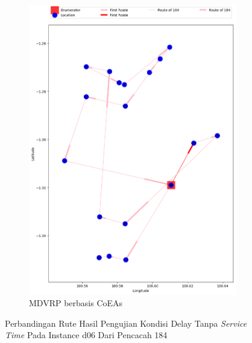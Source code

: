 \begin{figure}[H]
	\centering
	\begin{subfigure}[t]{\textwidth}
		\centering
		\includegraphics[width=\textwidth]{Resources/Images/delayed_6/real_m15_n100_delayed_6_184_coes}
		\caption{MDVRP berbasis CoEAs}
		\label{fig:real_m15_n100_delayed_6_184_coes}
	\end{subfigure}
	\caption{Perbandingan Rute Hasil Pengujian Kondisi Delay Tanpa \textit{Service Time} Pada Instance d06 Dari Pencacah 184}
	\label{fig:real_m15_n100_delayed_6_184}
\end{figure}


